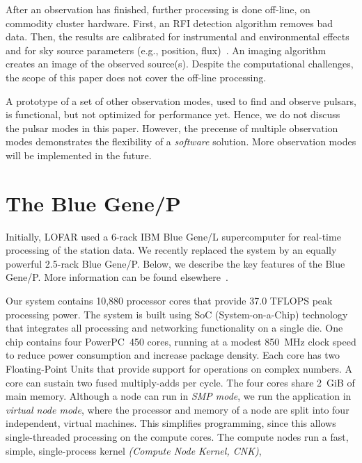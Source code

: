 \documentclass{sig-alternate}
\begin{document}
After an observation has finished, further processing is done off-line, on
commodity cluster hardware. 
First, an RFI detection algorithm removes bad data.
Then, the results are calibrated for instrumental and environmental effects and
for sky source parameters (e.g., position, flux)~\cite{Nijboer:07}.
An imaging algorithm creates an image of the observed source(s).
Despite the computational challenges, the scope of this paper does not cover
the off-line processing.

A prototype of a set of other observation modes, used to find and observe
pulsars, is functional, but not optimized for performance yet.
Hence, we do not discuss the pulsar modes in this paper.
However, the precense of multiple observation modes demonstrates the
flexibility of a \emph{software\/} solution.
More observation modes will be implemented in the future.


\section{The Blue Gene/P}
\label{sec:BG/P}

Initially, LOFAR used a 6-rack IBM Blue Gene/L supercomputer for real-time
processing of the station data.
We recently replaced the system by an equally powerful 2.5-rack Blue Gene/P.
Below, we describe the key features of the Blue Gene/P.
More information can be found elsewhere~\cite{IBM:08}.

Our system contains 10,880 processor cores that provide 37.0 TFLOPS peak
processing power.
The system is built using SoC (System-on-a-Chip) technology that integrates
all processing and networking functionality on a single die.
One chip contains four PowerPC~450 cores, running at a modest 850~MHz clock
speed to reduce power consumption and increase package density.
Each core has two Floating-Point Units that provide support for
operations on complex numbers.
A core can sustain two fused multiply-adds per cycle.
The four cores share 2~GiB of main memory.
Although a node can run in \emph{SMP mode}, we run the application in
\emph{virtual node mode}, where the processor and memory of a node are split
into four independent, virtual machines.
This simplifies programming, since this allows single-threaded processing
on the compute cores.  %
The compute nodes run a fast, simple, single-process kernel
\emph{(Compute Node Kernel, CNK)},
\end{document}
